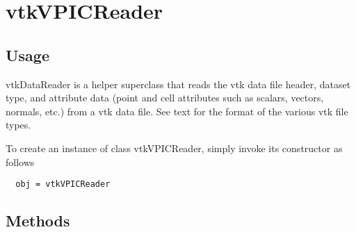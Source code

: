 \section{vtkVPICReader}

\subsection{Usage}

 vtkDataReader is a helper superclass that reads the vtk data file header,
 dataset type, and attribute data (point and cell attributes such as
 scalars, vectors, normals, etc.) from a vtk data file.  See text for
 the format of the various vtk file types.


To create an instance of class vtkVPICReader, simply
invoke its constructor as follows
\begin{verbatim}
  obj = vtkVPICReader
\end{verbatim}
\subsection{Methods}


